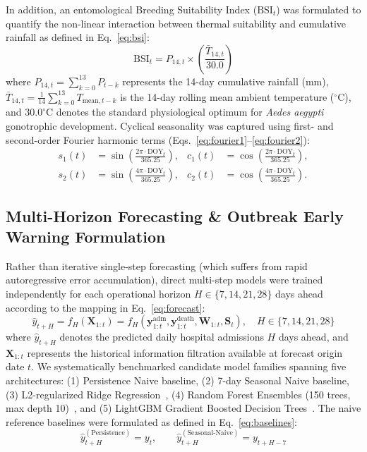 \documentclass[11pt,a4paper]{article}
\begin{document}
In addition, an entomological Breeding Suitability Index ($\text{BSI}_t$) was formulated to quantify the non-linear interaction between thermal suitability and cumulative rainfall as defined in Eq.~\eqref{eq:bsi}:
\begin{equation}
\text{BSI}_t = P_{14, t} \times \left(\frac{\bar{T}_{14, t}}{30.0}\right)
\label{eq:bsi}
\end{equation}
where $P_{14,t} = \sum_{k=0}^{13} P_{t-k}$ represents the 14-day cumulative rainfall (mm), $\bar{T}_{14,t} = \frac{1}{14}\sum_{k=0}^{13} T_{\text{mean}, t-k}$ is the 14-day rolling mean ambient temperature ($^\circ$C), and $30.0^\circ\text{C}$ denotes the standard physiological optimum for \textit{Aedes aegypti} gonotrophic development. Cyclical seasonality was captured using first- and second-order Fourier harmonic terms (Eqs.~\eqref{eq:fourier1}--\eqref{eq:fourier2}):
\begin{align}
s_1(t) &= \sin\left(\frac{2\pi \cdot \text{DOY}_t}{365.25}\right), & c_1(t) &= \cos\left(\frac{2\pi \cdot \text{DOY}_t}{365.25}\right), \label{eq:fourier1} \\
s_2(t) &= \sin\left(\frac{4\pi \cdot \text{DOY}_t}{365.25}\right), & c_2(t) &= \cos\left(\frac{4\pi \cdot \text{DOY}_t}{365.25}\right). \label{eq:fourier2}
\end{align}

\subsection{Multi-Horizon Forecasting \& Outbreak Early Warning Formulation}
Rather than iterative single-step forecasting (which suffers from rapid autoregressive error accumulation), direct multi-step models were trained independently for each operational horizon $H \in \{7, 14, 21, 28\}$ days ahead according to the mapping in Eq.~\eqref{eq:forecast}:
\begin{equation}
\hat{y}_{t+H} = f_H\left(\mathbf{X}_{1:t}\right) = f_H\left(\mathbf{y}_{1:t}^{\text{adm}}, \mathbf{y}_{1:t}^{\text{death}}, \mathbf{W}_{1:t}, \mathbf{S}_t\right), \quad H \in \{7, 14, 21, 28\}
\label{eq:forecast}
\end{equation}
where $\hat{y}_{t+H}$ denotes the predicted daily hospital admissions $H$ days ahead, and $\mathbf{X}_{1:t}$ represents the historical information filtration available at forecast origin date $t$. We systematically benchmarked candidate model families spanning five architectures: (1) Persistence Naive baseline, (2) 7-day Seasonal Naive baseline, (3) L2-regularized Ridge Regression~\cite{hoerl1970ridge}, (4) Random Forest Ensembles (150 trees, max depth 10)~\cite{breiman2001random,buczak2014prediction}, and (5) LightGBM Gradient Boosted Decision Trees~\cite{ke2017lightgbm}. The naive reference baselines were formulated as defined in Eq.~\eqref{eq:baselines}:
\begin{equation}
\hat{y}_{t+H}^{(\text{Persistence})} = y_t, \qquad \hat{y}_{t+H}^{(\text{Seasonal-Naive})} = y_{t+H-7}
\label{eq:baselines}
\end{equation}
\end{document}
